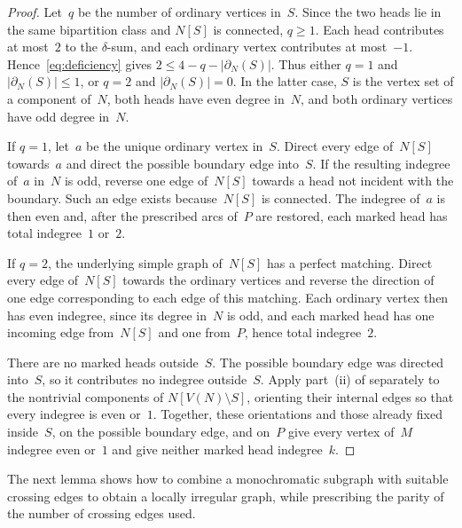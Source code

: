 \documentclass[12pt,reqno,a4paper]{amsart}
\begin{document}
\begin{proof}
  Let~$q$ be the number of ordinary vertices in~$S$.
  Since the two heads lie in the same bipartition class and $N[S]$ is
  connected, $q \ge 1$.
  Each head contributes at most~$2$ to the $\delta$-sum, and each ordinary
  vertex contributes at most~$-1$. 
  Hence~\eqref{eq:deficiency} gives $2 \le 4 - q - |\partial_N(S)|$.
  Thus either $q = 1$ and $|\partial_N(S)| \le 1$, or $q = 2$ and
  $|\partial_N(S)| = 0$.
  In the latter case, $S$ is the vertex set of a component of~$N$, both heads
  have even degree in~$N$, and both ordinary vertices have odd degree in~$N$.

  If $q = 1$, let~$a$ be the unique ordinary vertex in~$S$.
  Direct every edge of~$N[S]$ towards~$a$ and direct the possible boundary edge
  into~$S$.
  If the resulting indegree of~$a$ in~$N$ is odd, reverse one edge of~$N[S]$
  towards a head not incident with the boundary.
  Such an edge exists because~$N[S]$ is connected. 
  The indegree of~$a$ is then even and, after the prescribed arcs of~$P$ are
  restored, each marked head has total indegree~$1$ or~$2$.

  If $q = 2$, the underlying simple graph of~$N[S]$ has a perfect matching.
  Direct every edge of~$N[S]$ towards the ordinary vertices and reverse the
  direction of one edge corresponding to each edge of this matching. 
  Each ordinary vertex then has even indegree, since its degree in~$N$ is odd,
  and each marked head has one incoming edge from~$N[S]$ and one from~$P$,
  hence total indegree~$2$.

  There are no marked heads outside~$S$. 
  The possible boundary edge was directed into~$S$, so it contributes no
  indegree outside~$S$.
  Apply part~(ii) of  separately to the nontrivial
  components of $N[V(N) \setminus S]$, orienting their internal edges so that
  every indegree is even or~$1$.
  Together, these orientations and those already fixed inside~$S$, on the
  possible boundary edge, and on~$P$ give every vertex of~$M$ indegree even
  or~$1$ and give neither marked head indegree~$k$.
\end{proof}

The next lemma shows how to combine a monochromatic subgraph with suitable
crossing edges to obtain a locally irregular graph, while prescribing the
parity of the number of crossing edges used.
\end{document}
